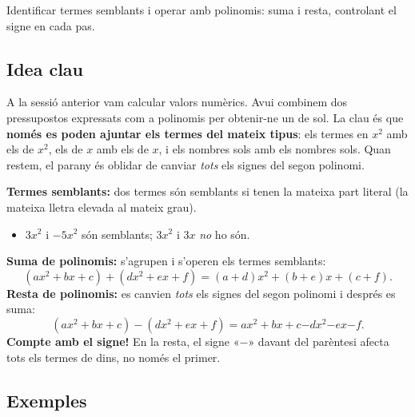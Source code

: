 %
{Identificar termes semblants i operar amb polinomis: suma i resta, controlant
el signe en cada pas.}

\subsection{Idea clau}

A la sessió anterior vam calcular valors numèrics. Avui combinem dos pressupostos
expressats com a polinomis per obtenir-ne un de sol. La clau és que
\textbf{només es poden ajuntar els termes del mateix tipus}: els termes en $x^2$
amb els de $x^2$, els de $x$ amb els de $x$, i els nombres sols amb els nombres
sols. Quan restem, el parany és oblidar de canviar \emph{tots} els signes del
segon polinomi.

\begin{idea}
\textbf{Termes semblants:} dos termes són semblants si tenen la mateixa part
literal (la mateixa lletra elevada al mateix grau).
\begin{itemize}[leftmargin=1.4em, itemsep=2pt]
  \item $3x^2$ i $-5x^2$ són semblants; $3x^2$ i $3x$ \emph{no} ho són.
\end{itemize}
\textbf{Suma de polinomis:} s'agrupen i s'operen els termes semblants:
\[
(ax^2 + bx + c) + (dx^2 + ex + f) = (a+d)x^2 + (b+e)x + (c+f).
\]
\textbf{Resta de polinomis:} es canvien \emph{tots} els signes del segon polinomi
i després es suma:
\[
(ax^2+bx+c)-(dx^2+ex+f) = ax^2+bx+c \mathbf{-}dx^2 \mathbf{-}ex \mathbf{-}f.
\]
\textbf{Compte amb el signe!} En la resta, el signe «$-$» davant del parèntesi
afecta tots els termes de dins, no només el primer.
\end{idea}

\subsection{Exemples}

